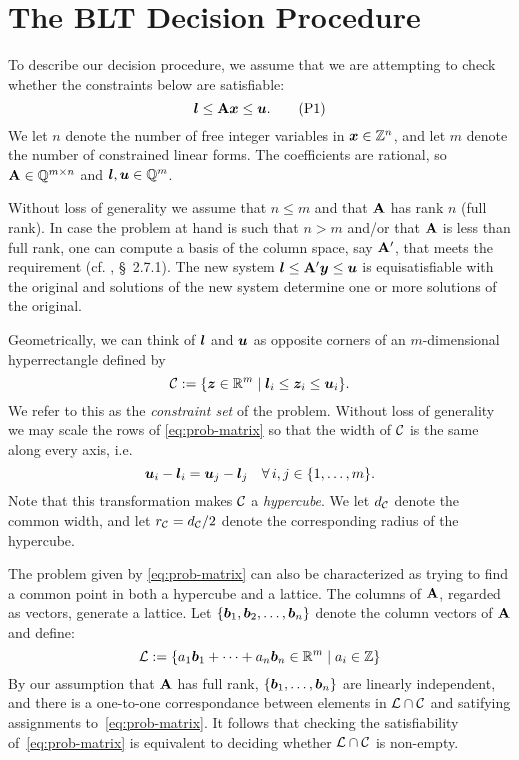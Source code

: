 \section{The BLT Decision Procedure}
\label{sec:dp}

To describe our decision procedure, we assume that we are attempting
to check whether the constraints below are satisfiable:
%
\begin{equation}
\label{eq:prob-matrix}
    \boldsymbol{l} \le \mathbf{A} \boldsymbol{x} \le \boldsymbol{u}.
    \tag{P1}
\end{equation}
%
We let $n$ denote the number of free integer variables in $\boldsymbol{x} \in \mathbb{Z}^n$,
and let $m$ denote the number of constrained linear forms.  The coefficients
are rational, so $\mathbf{A} \in \mathbb{Q}^{m \times n}$ and $\boldsymbol{l},\boldsymbol{u} \in \mathbb{Q}^m$.

Without loss of generality we assume that $n \le m$ and that $\mathbf{A}$ has
rank $n$ (full rank). In case the problem at hand is such that $n > m$ and/or
that $\mathbf{A}$ is less than full rank, one can compute a basis of the column
space, say $\mathbf{A}'$, that meets the requirement (cf. \cite{Cohen}, \S~2.7.1).
The new system $\boldsymbol{l} \le \mathbf{A}' \boldsymbol{y} \le \boldsymbol{u}$ is equisatisfiable with
the original and solutions of the new system
determine one or more solutions of the original.

Geometrically, we can think of $\boldsymbol{l}$ and $\boldsymbol{u}$ as opposite corners of an
$m$-dimensional hyperrectangle defined by
%
\[ \mathcal{C} := \{ \boldsymbol{z} \in \mathbb{R}^m  \mid  \boldsymbol{l}_i \le \boldsymbol{z}_i \le \boldsymbol{u}_i \}. \]
%
We refer to this as the \emph{constraint set} of the problem.
Without loss of generality we may scale the rows of \eqref{eq:prob-matrix} so
that the width of $\mathcal{C}$ is the same along every axis, i.e.
%
\begin{equation}
    \label{eq:cube}
    \boldsymbol{u}_i - \boldsymbol{l}_i = \boldsymbol{u}_j - \boldsymbol{l}_j \quad \forall \, i,j \in \{1,\ldots,m\}.
\end{equation}
%
Note that this transformation makes $\mathcal{C}$ a \emph{hypercube}.
We let $d_{\mathcal{C}}$ denote the common width, and let $r_{\mathcal{C}} = d_{\mathcal{C}}/2$ denote the
corresponding radius of the hypercube.

The problem given by \eqref{eq:prob-matrix} can also be characterized as
trying to find a common point in both a hypercube and a
lattice.
The columns of $\mathbf{A}$, regarded as vectors, generate a lattice.
%
Let $\{\boldsymbol{b}_1, \boldsymbol{b}_2, \ldots, \boldsymbol{b}_n\}$ denote the column vectors of $\mathbf{A}$ and define:
%
\begin{equation}
    \label{eq:lattice-def}
    \mathcal{L} := \left\{ a_1 \boldsymbol{b}_1 + \cdots + a_n \boldsymbol{b}_n \in \mathbb{R}^m \mid
            a_i \in \mathbb{Z} \right\}
\end{equation}
%
By our assumption that $\mathbf{A}$ has full rank,
$\{\boldsymbol{b}_1, \ldots, \boldsymbol{b}_n\}$ are linearly independent,
and there is a one-to-one
correspondance between elements in $\mathcal{L} \cap \mathcal{C}$ and
satifying assignments to~\eqref{eq:prob-matrix}.
%
It follows that checking the satisfiability of~\eqref{eq:prob-matrix}
is equivalent to deciding whether $\mathcal{L} \cap \mathcal{C}$ is non-empty.

